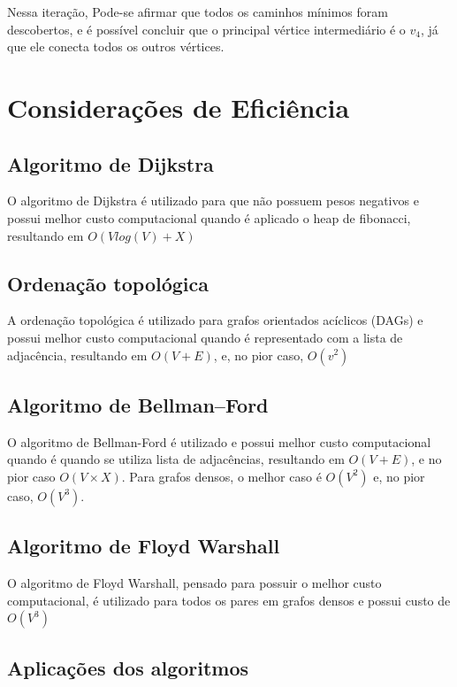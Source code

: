 Nessa iteração, Pode-se afirmar que todos os caminhos mínimos foram descobertos, e é possível concluir que o principal vértice intermediário é o $ v_4 $, já que ele conecta todos os outros vértices. 

\section{Considerações de Eficiência}\label{sec:caminhoEfic}

\subsection{Algoritmo de Dijkstra}\label{sec:dijkstraO}

	O algoritmo de Dijkstra é utilizado para que não possuem pesos negativos e possui melhor custo computacional quando é aplicado o heap de fibonacci, resultando em $ O(Vlog(V) + X) $

\subsection{Ordenação topológica}\label{sec:ordTopologicaO}
	A ordenação topológica é utilizado para grafos orientados acíclicos (DAGs) e possui melhor custo computacional quando é representado com a lista de adjacência, resultando em $ O(V + E) $, e, no pior caso, $ O(v^2) $
\subsection{Algoritmo de Bellman–Ford}\label{sec:bellmanFordO}

	O algoritmo de Bellman-Ford é utilizado  e possui melhor custo computacional quando é quando se utiliza lista de adjacências, resultando em $ O(V+E) $, e no pior caso $ O(V \times X) $. Para grafos densos, o melhor caso é $ O(V^2) $ e, no pior caso, $ O(V^3) $.

\subsection{Algoritmo de Floyd Warshall}\label{sec:floydWO}

	O algoritmo de Floyd Warshall, pensado para possuir o melhor custo computacional, é utilizado para todos os pares em grafos densos e possui custo de $ O(V^3) $

\subsection{Aplicações dos algoritmos}\label{sec:difAG}

